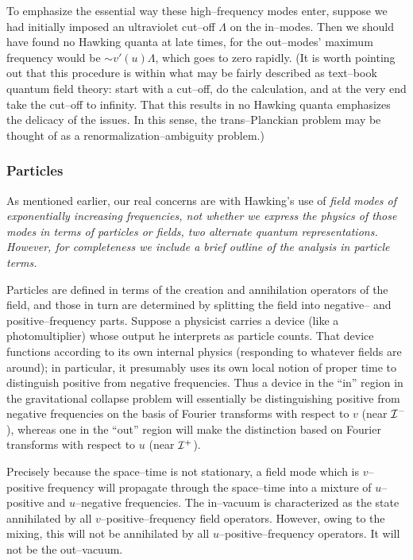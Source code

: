 To emphasize the essential way these high--frequency modes enter, suppose we had
initially imposed an ultraviolet cut--off $\Lambda$ on the in--modes.  Then we
should have found no Hawking quanta at late times, for the out--modes' maximum
frequency would be $\sim v'(u)\Lambda$, which goes to zero rapidly.  
(It is worth pointing out that this procedure is within what may be fairly
described as text--book quantum field theory:  start with a cut--off, do the
calculation, and at the very end take the cut--off to infinity.  That this
results in no Hawking quanta emphasizes the delicacy of the issues.  In this
sense, the trans--Planckian problem may be thought of as a
renormalization--ambiguity problem.)


\subsubsection{Particles}

As mentioned earlier, our real concerns are with Hawking's use of \it field
modes \rm of exponentially increasing frequencies, not whether we express the
physics of those modes in terms of particles or fields, two alternate quantum
representations.  However, for completeness we include a brief outline of the
analysis in particle terms.

Particles are defined in terms of the creation and annihilation operators of the
field, and those in turn are determined by splitting the field into negative--
and positive--frequency parts.  Suppose a physicist carries a device (like a
photomultiplier) whose output he interprets as particle counts.  That device
functions according to its own internal physics (responding to whatever fields
are around); in particular, it presumably uses its own local notion of proper
time to distinguish positive from negative frequencies.  Thus a device in the
``in'' region in the gravitational collapse problem will essentially be
distinguishing positive from negative frequencies on the basis of Fourier
transforms with respect to $v$ (near ${\cal I} ^-$), whereas one in the ``out''
region will make the distinction based on Fourier transforms with respect to $u$
(near ${\cal I} ^+$).  

Precisely because the space--time is not stationary, a field
mode which is $v$--positive frequency will propagate through the space--time
into a mixture of $u$--positive and $u$--negative frequencies.  The in--vacuum
is characterized as the state annihilated by all $v$--positive--frequency field
operators.  However, owing to the mixing, this will not be annihilated by all
$u$--positive--frequency operators.  It will not be the out--vacuum.

